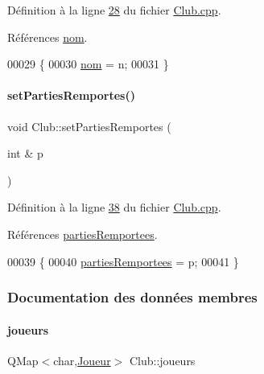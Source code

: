 Définition à la ligne \hyperlink{_club_8cpp_source_l00028}{28} du fichier \hyperlink{_club_8cpp_source}{Club.\+cpp}.



Références \hyperlink{_club_8h_source_l00020}{nom}.


\begin{DoxyCode}
00029 \{
00030     \hyperlink{class_club_a18e1489d02110a82a0c8706f52091002}{nom} = n;
00031 \}
\end{DoxyCode}
\mbox{\label{class_club_ad1711f2742e385ef00174b3ebd98b165}} 
\paragraph{\texorpdfstring{set\+Parties\+Remportes()}{setPartiesRemportes()}}
{\footnotesize\ttfamily void Club\+::set\+Parties\+Remportes (\begin{DoxyParamCaption}\item[{int \&}]{p }\end{DoxyParamCaption})}



Définition à la ligne \hyperlink{_club_8cpp_source_l00038}{38} du fichier \hyperlink{_club_8cpp_source}{Club.\+cpp}.



Références \hyperlink{_club_8h_source_l00021}{parties\+Remportees}.


\begin{DoxyCode}
00039 \{
00040     \hyperlink{class_club_a1c5dd1362656cb4829de483255ffc39a}{partiesRemportees} = p;
00041 \}
\end{DoxyCode}


\subsubsection{Documentation des données membres}
\mbox{\label{class_club_a1546f281ba72a07e52cbfd2a60af699b}} 
\paragraph{\texorpdfstring{joueurs}{joueurs}}
{\footnotesize\ttfamily Q\+Map$<$char,\hyperlink{class_joueur}{Joueur}$>$ Club\+::joueurs\hspace{0.3cm}{\ttfamily [private]}}



